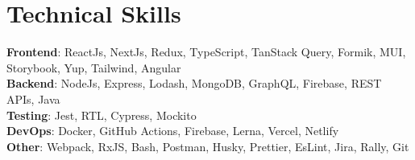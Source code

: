 \documentclass[letterpaper,12pt]{article}
\begin{document}
\section{Technical Skills}
 \begin{itemize}[leftmargin=0.15in, label={}]
    \small{\item{
     \textbf{Frontend}{: ReactJs, NextJs, Redux, TypeScript, TanStack Query, Formik, MUI, Storybook, Yup, Tailwind, Angular} \\
     \textbf{Backend}{: NodeJs, Express, Lodash, MongoDB, GraphQL, Firebase, REST APIs, Java} \\
     \textbf{Testing}{: Jest, RTL, Cypress, Mockito} \\
     \textbf{DevOps}{: Docker, GitHub Actions, Firebase, Lerna, Vercel, Netlify} \\
     \textbf{Other}{: Webpack, RxJS, Bash, Postman, Husky, Prettier, EsLint, Jira, Rally, Git}
    }}
 \end{itemize}
 \vspace{-16pt}
\end{document}
